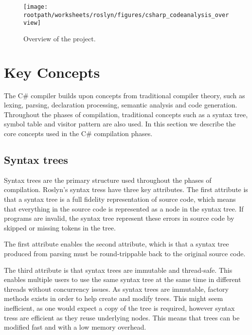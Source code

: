 \begin{figure}[htbp]
\centering
 \texttt{[image: \\rootpath/worksheets/roslyn/figures/csharp\_codeanalysis\_overview]} 
 \caption{Overview of the  project.}
\label{fig:roslyn_csharpanalysis_overview}
\end{figure}

\section{Key Concepts}
The C\# compiler builds upon concepts from traditional compiler theory, such as lexing, parsing, declaration processing, semantic analysis and code generation\cite{sebestaProLang}\cite{fischer2009crafting}. Throughout the phases of compilation, traditional concepts such as a syntax tree, symbol table and visitor pattern are also used. In this section we describe the core concepts used in the C\# compilation phases.

\subsection{Syntax trees}
Syntax trees are the primary structure used throughout the phases of compilation. Roslyn's syntax tress have three key attributes\cite[p. 6]{ng2012roslyn}. The first attribute is that a syntax tree is a full fidelity representation of source code, which means that everything in the source code is represented as a node in the syntax tree. If programs are invalid, the syntax tree represent these errors in source code by skipped or missing tokens in the tree. 

The first attribute enables the second attribute, which is that a syntax tree produced from parsing must be round-trippable back to the original source code.

The third attribute is that syntax trees are immutable and thread-safe. This enables multiple users to use the same syntax tree at the same time in different threads without concurrency issues. As syntax trees are immutable, factory methods exists in order to help create and modify trees. This might seem inefficient, as one would expect a copy of the tree is required, however syntax tress are efficient as they reuse underlying nodes. This means that trees can be modified fast and with a low memory overhead.

